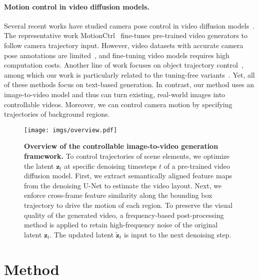 \documentclass{article} \usepackage{iclr2025_conference,times}
\begin{document}
\paragraph{Motion control in video diffusion models.}
Several recent works have studied camera pose control in video diffusion models~\citep{CameraCtrl,xu2024camco,kuang2024collaborative,MotionMaster,xiao2024video,hou2024training,bahmani2024vd3d,li2024image,zhang2024dragentity}.
The representative work MotionCtrl~\citep{MotionCtrl} fine-tunes pre-trained video generators to follow camera trajectory input. 
However, video datasets with accurate camera pose annotations are limited~\citep{RealEstate10k}, and fine-tuning video models requires high computation costs.
Another line of work focuses on object trajectory control~\citep{wang2023videocomposer,yin2023dragnuwa,wu2024draganything,zhou2024trackgo,wang2024boximator,zhang2024tora}, among which our work is particularly related to the tuning-free variants~\citep{qiu2024freetraj,ma2023trailblazer,DirectAVideo,jain2024peekaboo,Img2VidAnim-Zero}.
Yet, all of these methods focus on text-based generation. In contrast, our method uses an image-to-video model and thus can turn existing, real-world images into controllable videos.
Moreover, we can control camera motion by specifying trajectories of background regions. 



 \begin{figure}[!t]
\centering
\texttt{[image: imgs/overview.pdf]}
\caption{\textbf{Overview of the controllable image-to-video generation framework.}
To control trajectories of scene elements, we optimize the latent $\bm{z}_t$ at specific denoising timesteps $t$ of a pre-trained video diffusion model.
First, we extract semantically aligned feature maps from the denoising U-Net to estimate the video layout.
Next, we enforce cross-frame feature similarity along the bounding box trajectory to drive the motion of each region.
To preserve the visual quality of the generated video, a frequency-based post-processing method is applied to retain high-frequency noise of the original latent $\bm{z}_t$. The updated latent $\tilde{\bm{z}}_t$
 is input to the next denoising step.
}
\label{fig:method}
\vspace{-2.0mm}
\end{figure}
 
\section{Method}
\label{sec:method}
\end{document}
